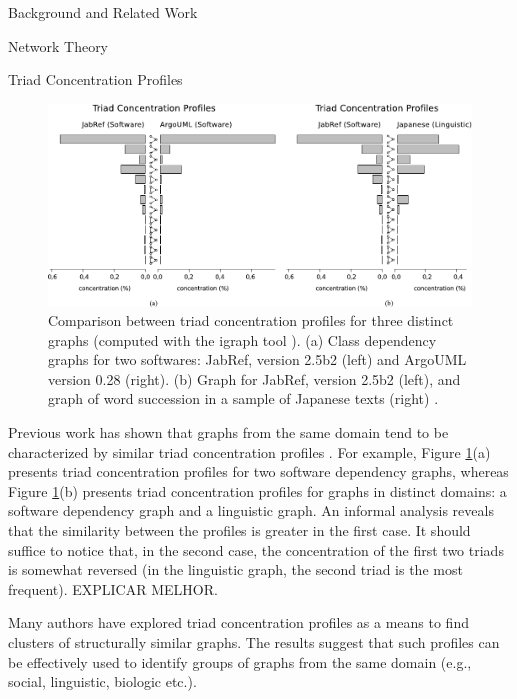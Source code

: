 \documentclass[11pt,twocolumn,a4paper,english]{article}
\begin{document}
\begin{section}{Background and Related Work}
\begin{subsection}{Network Theory}
\begin{subsubsection}{Triad Concentration Profiles}
	\begin{figure}[htbp]
		\centering
			\includegraphics[scale=1]{figures/tcp}
		\caption{Comparison between triad concentration profiles for three distinct graphs (computed with the igraph tool \cite{igraph}). (a) Class dependency graphs for two softwares: JabRef, version 2.5b2 (left) and ArgoUML version 0.28 (right). (b) Graph for JabRef, version 2.5b2 (left), and graph of word succession in a sample of Japanese texts (right) \cite{Milo2004}.}
		\label{fig:tcp}
	\end{figure}
	
	Previous work has shown that graphs from the same domain tend to be characterized by similar triad concentration profiles \cite{Milo2002}. For example, Figure \ref{fig:tcp}(a) presents triad concentration profiles for two software dependency graphs, whereas Figure \ref{fig:tcp}(b) presents triad concentration profiles for graphs in distinct domains: a software dependency graph and a linguistic graph. An informal analysis reveals that the similarity between the profiles is greater in the first case. It should suffice to notice that, in the second case, the concentration of the first two triads is somewhat reversed (in the linguistic graph, the second triad is the most frequent). EXPLICAR MELHOR.



	Many authors \cite{Milo2004,Ma2007,Lin2008} have explored triad concentration profiles as a means to find clusters of structurally similar graphs. The results suggest that such profiles can be effectively used to identify groups of graphs from the same domain (e.g., social, linguistic, biologic etc.).
\end{subsubsection}
	
	

\end{subsection}
\end{section}
\end{document}
